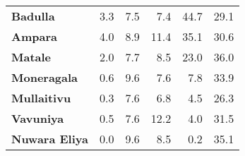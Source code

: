 \begin{tabular}{lrrrrr}
\textbf{Badulla     } &         3.3 &         7.5 &          7.4 &             44.7 &        29.1 \\
\textbf{Ampara      } &         4.0 &         8.9 &         11.4 &             35.1 &        30.6 \\
\textbf{Matale      } &         2.0 &         7.7 &          8.5 &             23.0 &        36.0 \\
\textbf{Moneragala  } &         0.6 &         9.6 &          7.6 &              7.8 &        33.9 \\
\textbf{Mullaitivu  } &         0.3 &         7.6 &          6.8 &              4.5 &        26.3 \\
\textbf{Vavuniya    } &         0.5 &         7.6 &         12.2 &              4.0 &        31.5 \\
\textbf{Nuwara Eliya} &         0.0 &         9.6 &          8.5 &              0.2 &        35.1 \\
\bottomrule
\end{tabular}
